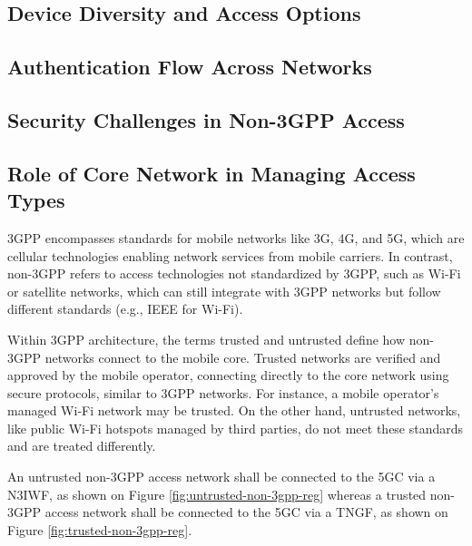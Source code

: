 \subsection{Device Diversity and Access Options}

\subsection{Authentication Flow Across Networks}

\subsection{Security Challenges in Non-3GPP Access}

\subsection{Role of Core Network in Managing Access Types}


\ac{3GPP} encompasses standards for mobile networks like \ac{3G}, \ac{4G}, and \ac{5G}, which are cellular technologies enabling network services from mobile carriers. In contrast, non-\ac{3GPP} refers to access technologies not standardized by \ac{3GPP}, such as Wi-Fi or satellite networks, which can still integrate with \ac{3GPP} networks but follow different standards (e.g., IEEE for Wi-Fi).

Within \ac{3GPP} architecture, the terms trusted and untrusted define how non-\ac{3GPP} networks connect to the mobile core. Trusted networks are verified and approved by the mobile operator, connecting directly to the core network using secure protocols, similar to \ac{3GPP} networks. For instance, a mobile operator’s managed Wi-Fi network may be trusted. On the other hand, untrusted networks, like public Wi-Fi hotspots managed by third parties, do not meet these standards and are treated differently.

An untrusted non-\ac{3GPP} access network shall be connected to the \ac{5GC} via a \ac{N3IWF}, as shown on Figure \ref{fig:untrusted-non-3gpp-reg} whereas a trusted non-\ac{3GPP} access network shall be connected to the \ac{5GC} via a \ac{TNGF}, as shown on Figure \ref{fig:trusted-non-3gpp-reg}.~\cite{23.501-p58-63}

